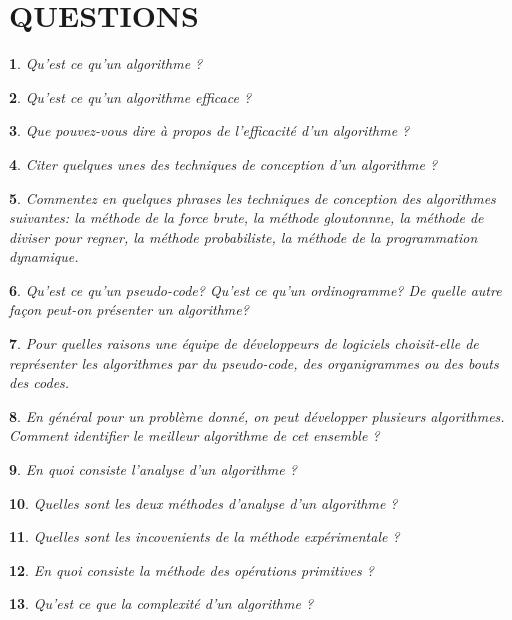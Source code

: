\documentclass[12pt,a4paper,oneside]{book}
\newtheorem{Qu}{}
\begin{document}
	\section*{QUESTIONS}
	\begin{Qu}
		Qu'est ce qu'un algorithme ?
	\end{Qu}
\begin{Qu}
	Qu'est ce qu'un algorithme efficace ?
\end{Qu}
\begin{Qu}
	Que pouvez-vous dire à propos de l'efficacité d'un algorithme ?
\end{Qu}
\begin{Qu}
	Citer quelques unes des techniques de conception d'un algorithme ?
	
\end{Qu}
\begin{Qu}
	Commentez en quelques phrases les techniques de conception des algorithmes suivantes: la méthode de la force brute, la méthode gloutonnne, la méthode de diviser pour regner, la méthode probabiliste, la méthode de la programmation dynamique. 
\end{Qu}
\begin{Qu}
	Qu'est ce qu'un pseudo-code? Qu'est ce qu'un ordinogramme? De quelle autre façon peut-on présenter un algorithme?
	\end{Qu}
\begin{Qu}
	Pour quelles raisons une équipe de développeurs de logiciels choisit-elle de représenter les algorithmes par du pseudo-code, des organigrammes ou des bouts des codes.
\end{Qu}
\begin{Qu}
	En général pour un problème donné, on peut développer plusieurs algorithmes. Comment identifier le meilleur algorithme de cet ensemble ?
\end{Qu}
\begin{Qu}
	En quoi consiste l'analyse d'un algorithme ?
	
\end{Qu}
\begin{Qu}
	Quelles sont les deux méthodes d'analyse d'un algorithme ?
\end{Qu}
\begin{Qu}
	Quelles sont les incovenients de la méthode expérimentale ?
\end{Qu}
\begin{Qu}
	En quoi consiste la méthode des opérations primitives ?
\end{Qu}
\begin{Qu}
	Qu'est ce que la complexité d'un algorithme ?
\end{Qu}
\end{document}
